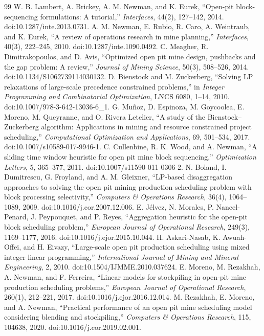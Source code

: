 \documentclass[11pt]{article}
\begin{document}
\begin{thebibliography}{99}
 W. B. Lambert, A. Brickey, A. M. Newman, and K. Eurek, ``Open-pit block-sequencing formulations: A tutorial,'' \emph{Interfaces}, 44(2), 127--142, 2014. doi:10.1287/inte.2013.0731.
 A. M. Newman, E. Rubio, R. Caro, A. Weintraub, and K. Eurek, ``A review of operations research in mine planning,'' \emph{Interfaces}, 40(3), 222--245, 2010. doi:10.1287/inte.1090.0492.
 C. Meagher, R. Dimitrakopoulos, and D. Avis, ``Optimized open pit mine design, pushbacks and the gap problem: A review,'' \emph{Journal of Mining Science}, 50(3), 508--526, 2014. doi:10.1134/S1062739114030132.
 D. Bienstock and M. Zuckerberg, ``Solving LP relaxations of large-scale precedence constrained problems,'' in \emph{Integer Programming and Combinatorial Optimization}, LNCS 6080, 1--14, 2010. doi:10.1007/978-3-642-13036-6\_1.
 G. Mu\~noz, D. Espinoza, M. Goycoolea, E. Moreno, M. Queyranne, and O. Rivera Letelier, ``A study of the Bienstock--Zuckerberg algorithm: Applications in mining and resource constrained project scheduling,'' \emph{Computational Optimization and Applications}, 69, 501--534, 2017. doi:10.1007/s10589-017-9946-1.
 C. Cullenbine, R. K. Wood, and A. Newman, ``A sliding time window heuristic for open pit mine block sequencing,'' \emph{Optimization Letters}, 5, 365--377, 2011. doi:10.1007/s11590-011-0306-2.
 N. Boland, I. Dumitrescu, G. Froyland, and A. M. Gleixner, ``LP-based disaggregation approaches to solving the open pit mining production scheduling problem with block processing selectivity,'' \emph{Computers \& Operations Research}, 36(4), 1064--1089, 2009. doi:10.1016/j.cor.2007.12.006.
 E. J\'elvez, N. Morales, P. Nancel-Penard, J. Peypouquet, and P. Reyes, ``Aggregation heuristic for the open-pit block scheduling problem,'' \emph{European Journal of Operational Research}, 249(3), 1169--1177, 2016. doi:10.1016/j.ejor.2015.10.044.
 H. Askari-Nasab, K. Awuah-Offei, and H. Eivazy, ``Large-scale open pit production scheduling using mixed integer linear programming,'' \emph{International Journal of Mining and Mineral Engineering}, 2, 2010. doi:10.1504/IJMME.2010.037624.
 E. Moreno, M. Rezakhah, A. Newman, and F. Ferreira, ``Linear models for stockpiling in open-pit mine production scheduling problems,'' \emph{European Journal of Operational Research}, 260(1), 212--221, 2017. doi:10.1016/j.ejor.2016.12.014.
 M. Rezakhah, E. Moreno, and A. Newman, ``Practical performance of an open pit mine scheduling model considering blending and stockpiling,'' \emph{Computers \& Operations Research}, 115, 104638, 2020. doi:10.1016/j.cor.2019.02.001.

\end{thebibliography}
\end{document}
